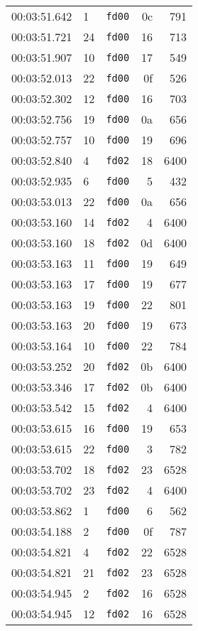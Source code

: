 \documentclass{article}
\begin{document}
\begin{longtable}{lllrr}
00:03:51.642 & 1 & \texttt{fd00} & 0c & 791 \\
00:03:51.721 & 24 & \texttt{fd00} & 16 & 713 \\
00:03:51.907 & 10 & \texttt{fd00} & 17 & 549 \\
00:03:52.013 & 22 & \texttt{fd00} & 0f & 526 \\
00:03:52.302 & 12 & \texttt{fd00} & 16 & 703 \\
00:03:52.756 & 19 & \texttt{fd00} & 0a & 656 \\
00:03:52.757 & 10 & \texttt{fd00} & 19 & 696 \\
00:03:52.840 & 4 & \texttt{fd02} & 18 & 6400 \\
00:03:52.935 & 6 & \texttt{fd00} & 5 & 432 \\
00:03:53.013 & 22 & \texttt{fd00} & 0a & 656 \\
00:03:53.160 & 14 & \texttt{fd02} & 4 & 6400 \\
00:03:53.160 & 18 & \texttt{fd02} & 0d & 6400 \\
00:03:53.163 & 11 & \texttt{fd00} & 19 & 649 \\
00:03:53.163 & 17 & \texttt{fd00} & 19 & 677 \\
00:03:53.163 & 19 & \texttt{fd00} & 22 & 801 \\
00:03:53.163 & 20 & \texttt{fd00} & 19 & 673 \\
00:03:53.164 & 10 & \texttt{fd00} & 22 & 784 \\
00:03:53.252 & 20 & \texttt{fd02} & 0b & 6400 \\
00:03:53.346 & 17 & \texttt{fd02} & 0b & 6400 \\
00:03:53.542 & 15 & \texttt{fd02} & 4 & 6400 \\
00:03:53.615 & 16 & \texttt{fd00} & 19 & 653 \\
00:03:53.615 & 22 & \texttt{fd00} & 3 & 782 \\
00:03:53.702 & 18 & \texttt{fd02} & 23 & 6528 \\
00:03:53.702 & 23 & \texttt{fd02} & 4 & 6400 \\
00:03:53.862 & 1 & \texttt{fd00} & 6 & 562 \\
00:03:54.188 & 2 & \texttt{fd00} & 0f & 787 \\
00:03:54.821 & 4 & \texttt{fd02} & 22 & 6528 \\
00:03:54.821 & 21 & \texttt{fd02} & 23 & 6528 \\
00:03:54.945 & 2 & \texttt{fd02} & 16 & 6528 \\
00:03:54.945 & 12 & \texttt{fd02} & 16 & 6528 \\

\end{longtable}
\end{document}
